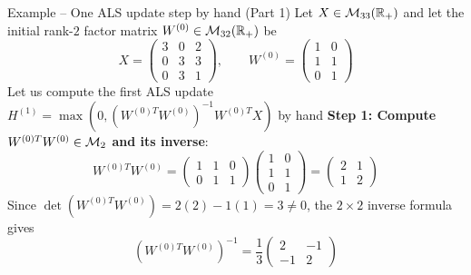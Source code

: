\documentclass[aspectratio=169]{beamer}\usepackage[]{graphicx}\usepackage[]{xcolor}
\begin{document}
\begin{frame}{Example -- One ALS update step by hand (Part 1)}
Let $X \in \mathcal{M}_{33}(\mathbb{R}_+)$ and let the initial rank-$2$ factor matrix $W^{(0)} \in \mathcal{M}_{32}(\mathbb{R}_+)$ be
\[
X = \begin{pmatrix} 3 & 0 & 2 \\ 0 & 3 & 3 \\ 0 & 3 & 1 \end{pmatrix}, \qquad
W^{(0)} = \begin{pmatrix} 1 & 0 \\ 1 & 1 \\ 0 & 1 \end{pmatrix}
\]
Let us compute the first ALS update $H^{(1)} = \max\!\left(0, (W^{(0)T} W^{(0)})^{-1} W^{(0)T} X\right)$ by hand
\vfill
\textbf{Step 1: Compute $W^{(0)T} W^{(0)} \in \mathcal{M}_2$ and its inverse}:
\[
W^{(0)T} W^{(0)} =
\begin{pmatrix} 1 & 1 & 0 \\ 0 & 1 & 1 \end{pmatrix}
\begin{pmatrix} 1 & 0 \\ 1 & 1 \\ 0 & 1 \end{pmatrix}
= \begin{pmatrix} 2 & 1 \\ 1 & 2 \end{pmatrix}
\]
Since $\det(W^{(0)T} W^{(0)}) = 2(2) - 1(1) = 3 \neq 0$, the $2 \times 2$ inverse formula gives
\[
(W^{(0)T} W^{(0)})^{-1} = \frac{1}{3} \begin{pmatrix} 2 & -1 \\ -1 & 2 \end{pmatrix}
\]
\end{frame}
\end{document}
